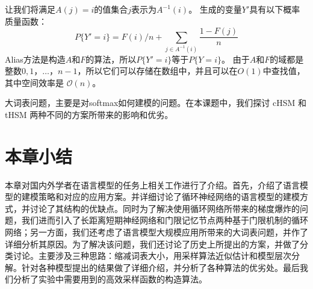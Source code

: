 让我们将满足$ A(j)= i $的值集合$ j $表示为$ A ^ { - 1}(i)$。 生成的变量$ Y'$具有以下概率质量函数：
\begin{equation}
  P\{Y' = i\} = F(i)/n + \sum_{j \in A^{-1}(i)}\frac{1-F(j)}{n}
\end{equation}
Alias方法是构造$ A $和$ F $的算法，所以$ P \{Y'= i \} $等于$ P\{Y = i \} $。 由于$ A $和$ F $的域都是整数$ 0,1，\ldots，n-1 $，所以它们可以存储在数组中，并且可以在$O(1)$中查找值，其中空间效率是 $\mathcal{O}(n)$。


大词表问题，主要是对softmax如何建模的问题。在本课题中，我们探讨 cHSM 和 tHSM 两种不同的方案所带来的影响和优劣。
\section{本章小结}
本章对国内外学者在语言模型的任务上相关工作进行了介绍。首先，介绍了语言模型的建模策略和对应的应用方案。并详细讨论了循环神经网络的语言模型的建模方式，并讨论了其结构的优缺点。同时为了解决使用循环网络所带来的梯度爆炸的问题，我们进而引入了长距离短期神经网络和门限记忆节点两种基于门限机制的循环网络；另一方面，我们还考虑了语言模型大规模应用所带来的大词表问题，并作了详细分析其原因。为了解决该问题，我们还讨论了历史上所提出的方案，并做了分类讨论。主要涉及三种思路：缩减词表大小，用采样算法近似估计和模型层次分解。针对各种模型提出的结果做了详细介绍，并分析了各种算法的优劣处。最后我们分析了实验中需要用到的高效采样函数的构造算法。